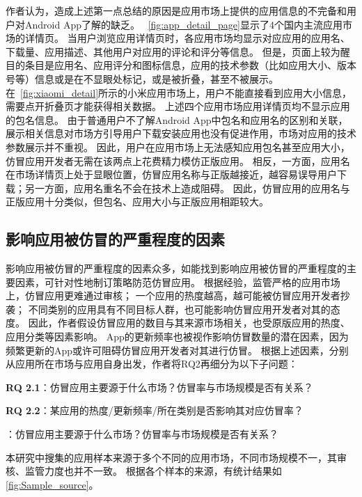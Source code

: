 作者认为，造成上述第一点总结的原因是应用市场上提供的应用信息的不完备和用户对Android App了解的缺乏。
~\autoref{fig:app_detail_page}显示了4个国内主流应用市场的详情页。
当用户浏览应用详情页时，各应用市场均显示对应应用的应用名、下载量、应用描述、其他用户对应用的评论和评分等信息。
但是，页面上较为醒目的条目是应用名、应用评分和图标信息，应用的技术参数（比如应用大小、版本号等）信息或是在不显眼处标记，或是被折叠，甚至不被展示。
在~\autoref{fig:xiaomi_detail}所示的小米应用市场上，用户不能直接看到应用大小信息，需要点开折叠页才能获得相关数据。
上述四个应用市场应用详情页均不显示应用的包名信息。
由于普通用户不了解Android App中包名和应用名的区别和关联，展示相关信息对市场方引导用户下载安装应用也没有促进作用，市场对应用的技术参数展示并不重视。
因此，用户在应用市场上无法感知应用包名甚至应用大小，仿冒应用开发者无需在该两点上花费精力模仿正版应用。
相反，一方面，应用名在市场详情页上处于显眼位置，仿冒应用名称与正版越接近，越容易误导用户下载；另一方面，应用名重名不会在技术上造成阻碍。
因此，仿冒应用的应用名与正版应用十分类似，但包名、应用大小与正版应用相距较大。

\subsection{影响应用被仿冒的严重程度的因素}
\label{sec:quantitativeStudy}


影响应用被仿冒的严重程度的因素众多，如能找到影响应用被仿冒的严重程度的主要因素，可针对性地制订策略防范仿冒应用。
根据经验，监管严格的应用市场上，仿冒应用更难通过审核；
一个应用的热度越高，越可能被仿冒应用开发者抄袭；
不同类别的应用具有不同目标人群，也可能影响仿冒应用开发者对其的态度。
因此，作者假设仿冒应用的数目与其来源市场相关，也受原版应用的热度、应用分类等因素影响。
App的更新频率也被视作影响仿冒数量的潜在因素，因为频繁更新的App或许可阻碍仿冒应用开发者对其进行仿冒。
根据上述因素，分别从应用所在市场与应用自身出发，作者将RQ2再细分为以下子问题：

{\bf RQ 2.1}：仿冒应用主要源于什么市场？仿冒率与市场规模是否有关系？

{\bf RQ 2.2}：某应用的热度/更新频率/所在类别是否影响其对应仿冒率？

：仿冒应用主要源于什么市场？仿冒率与市场规模是否有关系？

本研究中搜集的应用样本来源于多个不同的应用市场，不同市场规模不一，其审核、监管力度也并不一致。
根据各个样本的来源，有统计结果如\autoref{fig:Sample_source}。

